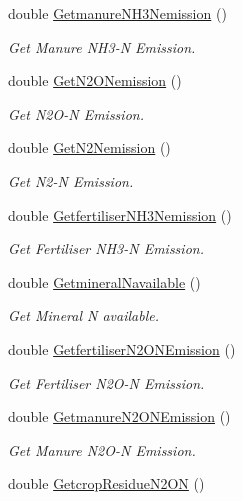 \begin{DoxyCompactItemize}
double \mbox{\hyperlink{class_crop_class_aa532ea6df8a69a2d0b44a42ce7d862e1}{Getmanure\+N\+H3\+Nemission}} ()
\begin{DoxyCompactList}\small\item\em Get Manure N\+H3-\/N Emission. \end{DoxyCompactList}\item 
double \mbox{\hyperlink{class_crop_class_ae582dbc59eafb0c86af12ae7ee7d5c8f}{Get\+N2\+O\+Nemission}} ()
\begin{DoxyCompactList}\small\item\em Get N2\+O-\/N Emission. \end{DoxyCompactList}\item 
double \mbox{\hyperlink{class_crop_class_a81108483d7d4f5e48405a58e07618c14}{Get\+N2\+Nemission}} ()
\begin{DoxyCompactList}\small\item\em Get N2-\/N Emission. \end{DoxyCompactList}\item 
double \mbox{\hyperlink{class_crop_class_afb4a450cc031ece2cb19055ce77f0be4}{Getfertiliser\+N\+H3\+Nemission}} ()
\begin{DoxyCompactList}\small\item\em Get Fertiliser N\+H3-\/N Emission. \end{DoxyCompactList}\item 
double \mbox{\hyperlink{class_crop_class_a436e6d75754c3cf937610a0b1cd337ea}{Getmineral\+Navailable}} ()
\begin{DoxyCompactList}\small\item\em Get Mineral N available. \end{DoxyCompactList}\item 
double \mbox{\hyperlink{class_crop_class_ac28ed49f8a4893ef18af0f01a841d629}{Getfertiliser\+N2\+O\+N\+Emission}} ()
\begin{DoxyCompactList}\small\item\em Get Fertiliser N2\+O-\/N Emission. \end{DoxyCompactList}\item 
double \mbox{\hyperlink{class_crop_class_aab815966a749158b0dd7bed57f67d1d7}{Getmanure\+N2\+O\+N\+Emission}} ()
\begin{DoxyCompactList}\small\item\em Get Manure N2\+O-\/N Emission. \end{DoxyCompactList}\item 
double \mbox{\hyperlink{class_crop_class_adc8b83cb3bc454c4072c1aafa74db691}{Getcrop\+Residue\+N2\+ON}} ()

\end{DoxyCompactItemize}

